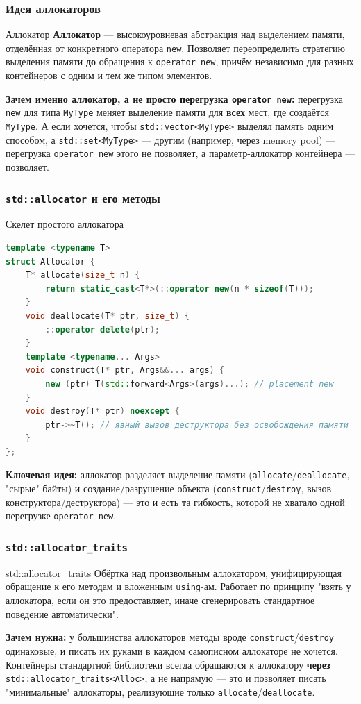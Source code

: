 \subsubsection{Идея аллокаторов}
\begin{definition}{Аллокатор}{}
\textbf{Аллокатор} --- высокоуровневая абстракция над выделением памяти, отделённая от конкретного оператора \texttt{new}. Позволяет переопределить стратегию выделения памяти \textbf{до} обращения к \texttt{operator new}, причём независимо для разных контейнеров с одним и тем же типом элементов.
\end{definition}
\textbf{Зачем именно аллокатор, а не просто перегрузка \texttt{operator new}:} перегрузка \texttt{new} для типа \texttt{MyType} меняет выделение памяти для \textbf{всех} мест, где создаётся \texttt{MyType}. А если хочется, чтобы \texttt{std::vector<MyType>} выделял память одним способом, а \texttt{std::set<MyType>} --- другим (например, через memory pool) --- перегрузка \texttt{operator new} этого не позволяет, а параметр-аллокатор контейнера --- позволяет.
\subsubsection{\texttt{std::allocator} и его методы}
\begin{implementation}{Скелет простого аллокатора}{}
\begin{lstlisting}[language=C++]
template <typename T>
struct Allocator {
    T* allocate(size_t n) {
        return static_cast<T*>(::operator new(n * sizeof(T)));
    }
    void deallocate(T* ptr, size_t) {
        ::operator delete(ptr);
    }
    template <typename... Args>
    void construct(T* ptr, Args&&... args) {
        new (ptr) T(std::forward<Args>(args)...); // placement new
    }
    void destroy(T* ptr) noexcept {
        ptr->~T(); // явный вызов деструктора без освобождения памяти
    }
};
\end{lstlisting}
\end{implementation}
\textbf{Ключевая идея:} аллокатор разделяет выделение памяти (\texttt{allocate}/\texttt{deallocate}, "сырые" байты) и создание/разрушение объекта (\texttt{construct}/\texttt{destroy}, вызов конструктора/деструктора) --- это и есть та гибкость, которой не хватало одной перегрузке \texttt{operator new}.
\subsubsection{\texttt{std::allocator\_traits}}
\begin{definition}{std::allocator\_traits}{}
Обёртка над произвольным аллокатором, унифицирующая обращение к его методам и вложенным \texttt{using}-ам. Работает по принципу "взять у аллокатора, если он это предоставляет, иначе сгенерировать стандартное поведение автоматически".
\end{definition}
\textbf{Зачем нужна:} у большинства аллокаторов методы вроде \texttt{construct}/\texttt{destroy} одинаковые, и писать их руками в каждом самописном аллокаторе не хочется. Контейнеры стандартной библиотеки всегда обращаются к аллокатору \textbf{через} \texttt{std::allocator\_traits<Alloc>}, а не напрямую --- это и позволяет писать "минимальные" аллокаторы, реализующие только \texttt{allocate}/\texttt{deallocate}.
